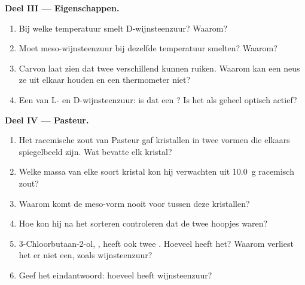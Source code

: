 \begin{problem}
\medskip
\noindent\textbf{Deel III --- Eigenschappen.}
\begin{enumerate}[resume]
  \item Bij welke temperatuur smelt D-wijnsteenzuur? Waarom?
  \item Moet meso-wijnsteenzuur bij dezelfde temperatuur smelten? Waarom?
  \item Carvon laat zien dat twee  verschillend kunnen ruiken.
        Waarom kan een neus ze uit elkaar houden en een thermometer niet?
  \item Een  van L- en D-wijnsteenzuur: is dat een
        ? Is het als geheel optisch actief?
\end{enumerate}

\medskip
\noindent\textbf{Deel IV --- Pasteur.}
\begin{enumerate}[resume]
  \item Het racemische zout van Pasteur gaf kristallen in twee vormen die
        elkaars spiegelbeeld zijn. Wat bevatte elk kristal?
  \item Welke massa van elke soort kristal kon hij verwachten uit
        \qty{10.0}{g} racemisch zout?
  \item Waarom komt de meso-vorm nooit voor tussen deze kristallen?
  \item Hoe kon hij na het sorteren controleren dat de twee hoopjes
         waren?
  \item 3-Chloorbutaan-2-ol, , heeft ook twee
        . Hoeveel  heeft het?
        Waarom verliest het er niet een, zoals wijnsteenzuur?
  \item Geef het eindantwoord: hoeveel  heeft
        wijnsteenzuur?
\end{enumerate}
\end{problem}
